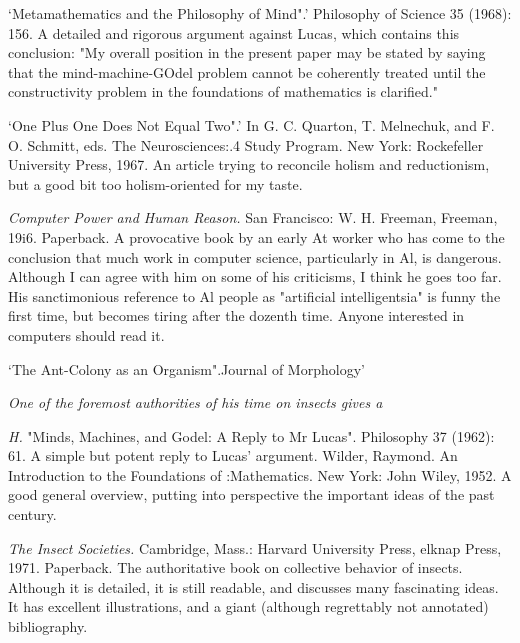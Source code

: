  `Metamathematics and the Philosophy of Mind".' Philosophy of Science 35 (1968): 156. A detailed and rigorous argument against Lucas, which contains this conclusion: "My overall position in the present paper may be stated by saying that the mind-machine-GOdel problem cannot be coherently treated until the constructivity problem in the foundations of mathematics is clarified."

 `One Plus One Does Not Equal Two".' In G. C. Quarton, T. Melnechuk, and F. O. Schmitt, eds. The Neurosciences:.4 Study Program. New York: Rockefeller University Press, 1967. An article trying to reconcile holism and reductionism, but a good bit too holism-oriented for my taste.

 {\sl Computer Power and Human Reason.} \llap{*\enspace}San Francisco: W. H. Freeman, Freeman, 19i6. Paperback. A provocative book by an early At worker who has come to the conclusion that much work in computer science, particularly in Al, is dangerous. Although I can agree with him on some of his criticisms, I think he goes too far. His sanctimonious reference to Al people as "artificial intelligentsia" is funny the first time, but becomes tiring after the dozenth time. Anyone interested in computers should read it.

 `The Ant-Colony as an Organism".Journal of Morphology' 

 {\sl One of the foremost authorities of his time on insects gives a} 

 {\sl } 

 {\sl H.} "Minds, Machines, and Godel: A Reply to Mr Lucas". Philosophy 37 (1962): 61. A simple but potent reply to Lucas' argument. Wilder, Raymond. An Introduction to the Foundations of :Mathematics. New York: John Wiley, 1952. A good general overview, putting into perspective the important ideas of the past century.

 {\sl The Insect Societies.} \llap{*\enspace}Cambridge, Mass.: Harvard University Press, elknap Press, 1971. Paperback. The authoritative book on collective behavior of insects. Although it is detailed, it is still readable, and discusses many fascinating ideas. It has excellent illustrations, and a giant (although regrettably not annotated) bibliography.

